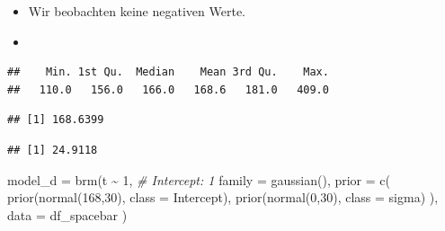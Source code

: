 \documentclass[
]{article}
\newenvironment{Shaded}{\begin{snugshade}}{\end{snugshade}}
\newcommand{\AttributeTok}[1]{\textcolor[rgb]{0.77,0.63,0.00}{#1}}
\newcommand{\CommentTok}[1]{\textcolor[rgb]{0.56,0.35,0.01}{\textit{#1}}}
\newcommand{\DecValTok}[1]{\textcolor[rgb]{0.00,0.00,0.81}{#1}}
\newcommand{\FunctionTok}[1]{\textcolor[rgb]{0.00,0.00,0.00}{#1}}
\newcommand{\NormalTok}[1]{#1}
\newcommand{\OtherTok}[1]{\textcolor[rgb]{0.56,0.35,0.01}{#1}}
\newcommand{\SpecialCharTok}[1]{\textcolor[rgb]{0.00,0.00,0.00}{#1}}
\providecommand{\tightlist}{%
  \setlength{\itemsep}{0pt}\setlength{\parskip}{0pt}}
\begin{document}
\begin{itemize}
\tightlist
\item
  Wir beobachten keine negativen Werte.
\item
\end{itemize}

\begin{Shaded}
\end{Shaded}

\begin{verbatim}
##    Min. 1st Qu.  Median    Mean 3rd Qu.    Max. 
##   110.0   156.0   166.0   168.6   181.0   409.0
\end{verbatim}

\begin{Shaded}
\end{Shaded}

\begin{verbatim}
## [1] 168.6399
\end{verbatim}

\begin{verbatim}
## [1] 24.9118
\end{verbatim}

\begin{Shaded}
\begin{Highlighting}[]
\NormalTok{model\_d }\OtherTok{=} \FunctionTok{brm}\NormalTok{(t }\SpecialCharTok{\textasciitilde{}} \DecValTok{1}\NormalTok{,    }\CommentTok{\# Intercept: 1}
              \AttributeTok{family =} \FunctionTok{gaussian}\NormalTok{(),}
              \AttributeTok{prior =}
                  \FunctionTok{c}\NormalTok{(}
                    \FunctionTok{prior}\NormalTok{(}\FunctionTok{normal}\NormalTok{(}\DecValTok{168}\NormalTok{,}\DecValTok{30}\NormalTok{), }\AttributeTok{class =}\NormalTok{ Intercept),}
                    \FunctionTok{prior}\NormalTok{(}\FunctionTok{normal}\NormalTok{(}\DecValTok{0}\NormalTok{,}\DecValTok{30}\NormalTok{), }\AttributeTok{class =}\NormalTok{ sigma)}
\NormalTok{                  ),}
                \AttributeTok{data =}\NormalTok{ df\_spacebar}
\NormalTok{              )}
\end{Highlighting}
\end{Shaded}
\end{document}
